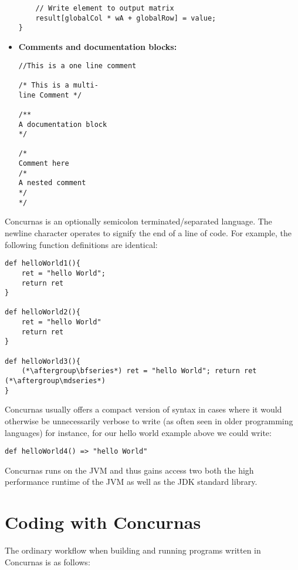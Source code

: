 \documentclass[conc-doc]{subfiles}
\begin{document}
\begin{itemize}
\begin{lstlisting}
	// Write element to output matrix
	result[globalCol * wA + globalRow] = value;
}
\end{lstlisting}

	\item \textbf{Comments and documentation blocks:}
\begin{lstlisting}
//This is a one line comment

/* This is a multi-
line Comment */

/** 
A documentation block 
*/

/*
Comment here
/*
A nested comment
*/
*/	
\end{lstlisting}
	
\end{itemize}


Concurnas is an optionally semicolon terminated/separated language. The newline character operates to signify the end of a line of code. For example, the following function definitions are identical:

\begin{lstlisting}
def helloWorld1(){
	ret = "hello World";
	return ret
}

def helloWorld2(){
	ret = "hello World"
	return ret
}

def helloWorld3(){	
	(*\aftergroup\bfseries*) ret = "hello World"; return ret (*\aftergroup\mdseries*)
}
\end{lstlisting}

Concurnas usually offers a compact version of syntax in cases where it would otherwise be unnecessarily verbose to write (as often seen in older programming languages) for instance, for our hello world example above we could write:

\begin{lstlisting}
def helloWorld4() => "hello World"
\end{lstlisting}

Concurnas runs on the JVM and thus gains access two both the high performance runtime of the JVM as well as the JDK standard library.

\section{Coding with Concurnas}

The ordinary workflow when building and running programs written in Concurnas is as follows:
\end{document}
